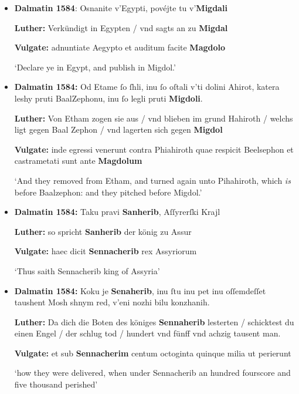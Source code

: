 \documentclass[output=paper,colorlinks,citecolor=brown,arabicfont,chinesefont]{langscibook}
\begin{document}
\begin{itemize}
    \item[] \textbf{Dalmatin 1584}: Osnanite v'Egypti, povéjte tu v'\textbf{Migdali}
    
    \textbf{Luther:} Verkündigt in Egypten / vnd sagts an zu \textbf{Migdal}
    
    \textbf{Vulgate:} adnuntiate Aegypto et auditum facite \textbf{Magdolo}
    
    ‘Declare ye in Egypt, and publish in Migdol.’

    \item[] \textbf{Dalmatin 1584:} Od Etame ſo ſhli, inu ſo oſtali v'ti dolini Ahirot, katera leshy pruti BaalZephonu, inu ſo legli pruti \textbf{Migdoli}.
    
    \textbf{Luther:} Von Etham zogen sie aus / vnd blieben im grund Hahiroth / welchs ligt gegen Baal Zephon / vnd lagerten sich gegen \textbf{Migdol}

    \textbf{Vulgate:} inde egressi venerunt contra Phiahiroth quae respicit Beelsephon et castrametati sunt ante \textbf{Magdolum}

    ‘And they removed from Etham, and turned again unto Pihahiroth, which \emph{is} before Baalzephon: and they pitched before Migdol.’

    \item[] \textbf{Dalmatin 1584:} Taku pravi \textbf{Sanherib}, Aſſyrerſki Krajl
    
    \textbf{Luther:} so spricht \textbf{Sanherib} der könig zu Assur 
    
    \textbf{Vulgate:} haec dicit \textbf{Sennacherib} rex Assyriorum
    
    ‘Thus saith Sennacherib king of Assyria’

    \item[] \textbf{Dalmatin 1584:} Koku je \textbf{Senaherib}, inu ſtu inu pet inu oſſemdeſſet taushent Mosh shnym red, v'eni nozhi bilu konzhanih.
    
    \textbf{Luther:} Da dich die Boten des königes \textbf{Sennaherib} lesterten / schicktest du einen Engel / der schlug tod / hundert vnd fünff vnd achzig tausent man.
    
    \textbf{Vulgate:} et sub \textbf{Sennacherim} centum octoginta quinque milia ut perierunt
    
    ‘how they were delivered, when under Sennacherib an hundred fourscore and five thousand perished’

\end{itemize}
\end{document}
